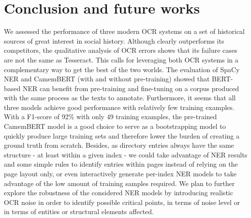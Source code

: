 \section{Conclusion and future works}
We assessed the performance of three modern OCR systems on a set of historical sources of great interest in social history.
Although \peroocr clearly outperforms its competitors, the qualitative analysis of OCR errors shows that its failure cases are not the same as Tesseract.
This calls for leveraging both OCR systems in a complementary way to get the best of the two worlds.
The evaluation of SpaCy NER and CamemBERT (with and without pre-training) showed that BERT-based NER can benefit from pre-training and fine-tuning on a corpus produced with the same process as the texts to annotate.
Furthermore, it seems that all three models achieve good performance with relatively few training examples.
With a F1-score of 92\% with only 49 training examples, the pre-trained CamemBERT model is a good choice to serve as a bootstrapping model to quickly produce large training sets and therefore lower the burden of creating a ground truth from scratch.
Besides, as directory entries always have the same structure - at least within a given index - we could take advantage of NER results and some simple rules to identify entries within pages instead of relying on the page layout only, or even interactively generate per-index NER models to take advantage of the low amount of training samples required.
We plan to further explore the robustness of the considered NER models by introducing realistic OCR noise in order to identify possible critical points, in terms of noise level or in terms of entities or structural elements affected.


